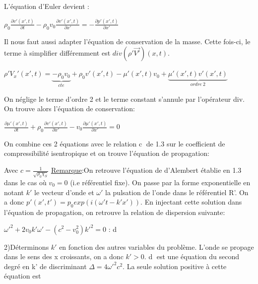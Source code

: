 \documentclass[a4paper, 12pt]{article}
\begin{document}
L'équation d'Euler devient :
\begin{center}
$\rho_0\frac{\partial v'(x',t)}{\partial t}-\rho_0v_0\frac{\partial v'(x',t)}{\partial x'}=-\frac{\partial p'(x',t)}{\partial x'}$
\end{center}
Il nous faut aussi adapter l'équation de conservation de la masse. Cette fois-ci, le terme à simplifier différemment est $div(\rho'\vec{V'})(x,t)$.
\begin{center}
$\rho'V_x'(x',t)=\underbrace{-\rho_0v_0}_{cte}+\rho_0v'(x',t)-\mu'(x',t)v_0+\underbrace{\mu'(x',t)v'(x',t)}_{ordre\:2}$
\end{center}
On néglige le terme d'ordre 2 et le terme constant s'annule par l'opérateur div. On trouve alors l'équation de conservation:
\begin{center}
$\frac{\partial \mu'(x',t)}{\partial t}+\rho_0\frac{\partial v'(x',t)}{\partial x'}-v_0\frac{\partial \mu'(x',t)}{\partial x'}=0$
\end{center}
On combine ces 2 équations avec le relation \textcircled{c} de 1.3 sur le coefficient de compressibilité isentropique et on trouve l'équation de propagation:
\begin{center}
\end{center}
Avec $c=\frac{1}{\sqrt{\rho_0\chi_S}}$\newline
\underline{Remarque}:On retrouve l'équation de d'Alembert établie en 1.3 dans le cas où $v_0=0$ (i.e référentiel fixe).\newline
On passe par la forme exponentielle en notant $k'$ le vecteur d'onde et $\omega'$ la pulsation de l'onde dans le référentiel R'. On a donc $p'(x',t')=p_0exp(i(\omega't-k'x'))$.\newline
En injectant cette solution dans l'équation de propagation, on retrouve la relation de dispersion suivante:
\begin{center}
$\omega'^2+2v_0k'\omega'-(c^2-v_0^2)k'^2=0$    : \textcircled{d}
\end{center}
2)Déterminons $k'$ en fonction des autres variables du problème.\newline \newline
L'onde se propage dans le sens des x croissants, on a donc $k'>0$. \textcircled{d} est une équation du second degré en k' de discriminant $\Delta=4\omega'^2c^2$.\newline
La seule solution positive à cette équation est
\end{document}

